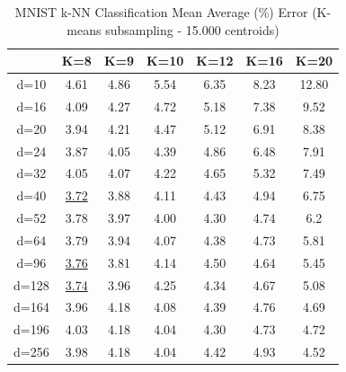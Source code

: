 \begin{table}[H]
\centering
\label{tab:table6}
\begin{tabular}{|c|c|c|c|c|c|c|}
\hline
& K=8 & K=9 & K=10 & K=12 & K=16 & K=20 \\
\hline
d=10 & 4.61 & 4.86 & 5.54 & 6.35 & 8.23 & 12.80 \\
d=16 & 4.09 & 4.27 & 4.72 & 5.18 & 7.38 & 9.52 \\
d=20 & 3.94 & 4.21 & 4.47 & 5.12 & 6.91 & 8.38 \\
d=24 & 3.87 & 4.05 & 4.39 & 4.86 & 6.48 & 7.91 \\
d=32 & 4.05 & 4.07 & 4.22 & 4.65 & 5.32 & 7.49 \\
d=40 & \underline{3.72} & 3.88 & 4.11 & 4.43 & 4.94 & 6.75 \\
d=52 & 3.78 & 3.97 & 4.00 & 4.30 & 4.74 & 6.2 \\
d=64 & 3.79 & 3.94 & 4.07 & 4.38 & 4.73 & 5.81 \\
d=96 & \underline{3.76} & 3.81 & 4.14 & 4.50 & 4.64 & 5.45 \\
d=128 & \underline{3.74} & 3.96 & 4.25 & 4.34 & 4.67 & 5.08 \\
d=164 & 3.96 & 4.18 & 4.08 & 4.39 & 4.76 & 4.69 \\
d=196 & 4.03 & 4.18 & 4.04 & 4.30 & 4.73 & 4.72 \\
d=256 & 3.98 & 4.18 & 4.04 & 4.42 & 4.93 & 4.52 \\
\hline
\end{tabular}
\caption{MNIST k-NN Classification Mean Average (\%) Error (K-means subsampling - 15.000 centroids)}
\end{table}

